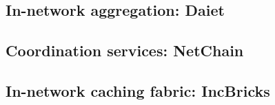 

\subsection{In-network aggregation: Daiet \texorpdfstring{\cite{daiet}}{}}

\newpage

\subsection{Coordination services: NetChain \texorpdfstring{\cite{netchain}}{}}

\newpage

\subsection{In-network caching fabric: IncBricks \texorpdfstring{\cite{incbricks}}{}}
